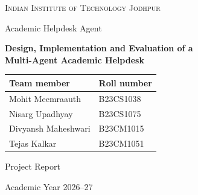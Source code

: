 \documentclass[11pt,a4paper]{article}
\begin{document}
\begin{titlepage}
\centering
\vspace*{1cm}
{\Large\textsc{Indian Institute of Technology Jodhpur}\par}
\vspace{0.4cm}
{\large Academic Helpdesk Agent\par}
\vspace{1.3cm}
{\Huge\bfseries Design, Implementation and Evaluation of a\\[0.2cm]
Multi-Agent Academic Helpdesk\par}
\vspace{1.0cm}
\vfill
\begin{tabular}{ll}
\textbf{Team member} & \textbf{Roll number}\\
\midrule
Mohit Meemraauth & B23CS1038\\
Nisarg Upadhyay & B23CS1075\\
Divyansh Maheshwari & B23CM1015\\
Tejas Kalkar & B23CM1051\\
\end{tabular}
\vfill
{\large Project Report\par}
{\large Academic Year 2026--27\par}
\end{titlepage}
\end{document}
